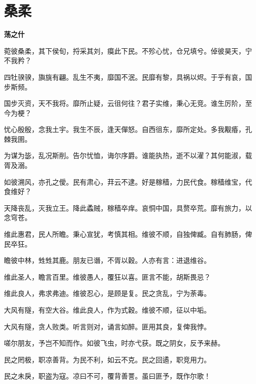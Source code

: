 \documentclass[12pt,a4paper]{ctexbook}
\begin{document}
\section{桑柔}
\textbf{荡之什}\par\vspace{0.5em}
菀彼桑柔，其下侯旬，捋采其刘，瘼此下民。不殄心忧，仓兄填兮。倬彼昊天，宁不我矜？\par
四牡骙骙，旟旐有翩。乱生不夷，靡国不泯。民靡有黎，具祸以烬。于乎有哀，国步斯频。\par
国步灭资，天不我将。靡所止疑，云徂何往？君子实维，秉心无竞。谁生厉阶，至今为梗？\par
忧心殷殷，念我土宇。我生不辰，逢天僤怒。自西徂东，靡所定处。多我觏痻，孔棘我圉。\par
为谋为毖，乱况斯削。告尔忧恤，诲尔序爵。谁能执热，逝不以濯？其何能淑，载胥及溺。\par
如彼溯风，亦孔之僾。民有肃心，荓云不逮。好是稼穑，力民代食。稼穑维宝，代食维好？\par
天降丧乱，灭我立王。降此蟊贼，稼穑卒痒。哀恫中国，具赘卒荒。靡有旅力，以念穹苍。\par
维此惠君，民人所瞻。秉心宣犹，考慎其相。维彼不顺，自独俾臧。自有肺肠，俾民卒狂。\par
瞻彼中林，甡甡其鹿。朋友已谮，不胥以穀。人亦有言：进退维谷。\par
维此圣人，瞻言百里。维彼愚人，覆狂以喜。匪言不能，胡斯畏忌？\par
维此良人，弗求弗迪。维彼忍心，是顾是复。民之贪乱，宁为荼毒。\par
大风有隧，有空大谷。维此良人，作为式穀。维彼不顺，征以中垢。\par
大风有隧，贪人败类。听言则对，诵言如醉。匪用其良，复俾我悖。\par
嗟尔朋友，予岂不知而作。如彼飞虫，时亦弋获。既之阴女，反予来赫。\par
民之罔极，职凉善背。为民不利，如云不克。民之回遹，职竞用力。\par
民之未戾，职盗为寇。凉曰不可，覆背善詈。虽曰匪予，既作尔歌！\par
\end{document}
